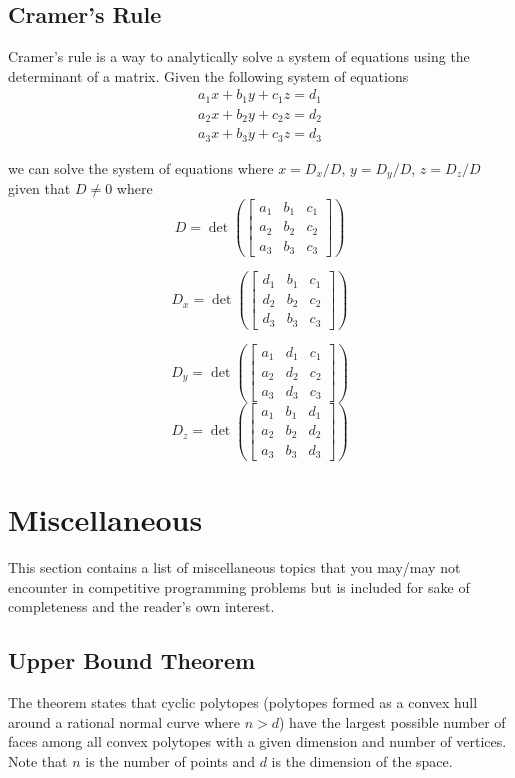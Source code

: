 \documentclass{article}
\begin{document}
\subsection{Cramer's Rule}
Cramer's rule is a way to analytically solve a system of equations using the determinant of a matrix. Given the following system of equations
$$\begin{array}{lcl} a_1x + b_1y + c_1z = d_1 \\ a_2x + b_2y + c_2z = d_2 \\ a_3x + b_3y + c_3z = d_3\end{array}$$

we can solve the system of equations where $x = D_x/D$, $y = D_y/D$, $z = D_z/D$ given that $D \neq 0$ where 
$$
D=\det\left(
\begin{bmatrix}
a_{1} & b_{1} & c_{1} \\
a_{2} & b_{2} & c_{2} \\
a_{3} & b_{3} & c_{3}
\end{bmatrix}
\right)
$$

$$
D_x=\det\left(
\begin{bmatrix}
d_{1} & b_{1} & c_{1} \\
d_{2} & b_{2} & c_{2} \\
d_{3} & b_{3} & c_{3}
\end{bmatrix}
\right)
$$

$$
D_y=\det\left(
\begin{bmatrix}
a_{1} & d_{1} & c_{1} \\
a_{2} & d_{2} & c_{2} \\
a_{3} & d_{3} & c_{3}
\end{bmatrix}
\right)
$$
$$
D_z=\det\left(
\begin{bmatrix}
a_{1} & b_{1} & d_{1} \\
a_{2} & b_{2} & d_{2} \\
a_{3} & b_{3} & d_{3}
\end{bmatrix}
\right)
$$

\section{Miscellaneous}
This section contains a list of miscellaneous topics that you may/may not encounter in competitive programming problems but is included for sake of completeness and the reader's own interest.

\subsection{Upper Bound Theorem}
The theorem states that cyclic polytopes (polytopes formed as a convex hull around a rational normal curve where $n>d$) have the largest possible number of faces among all convex polytopes with a given dimension and number of vertices. Note that $n$ is the number of points and $d$ is the dimension of the space.
\end{document}
